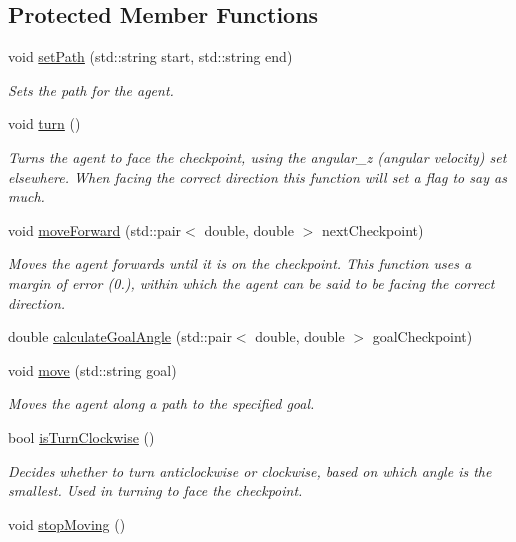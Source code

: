 \subsection*{Protected Member Functions}
\begin{DoxyCompactItemize}
\item 
void \hyperlink{classAgent_a20a0548f91fdfba2727ff8fddc3ce3dc}{set\-Path} (std\-::string start, std\-::string end)
\begin{DoxyCompactList}\small\item\em Sets the path for the agent. \end{DoxyCompactList}\item 
\hypertarget{classAgent_a49e310d66471525dfba98ee4e89e7865}{void \hyperlink{classAgent_a49e310d66471525dfba98ee4e89e7865}{turn} ()}\label{classAgent_a49e310d66471525dfba98ee4e89e7865}

\begin{DoxyCompactList}\small\item\em Turns the agent to face the checkpoint, using the angular\-\_\-z (angular velocity) set elsewhere. When facing the correct direction this function will set a flag to say as much. \end{DoxyCompactList}\item 
\hypertarget{classAgent_a155537d7cbac8ba6982415e15c8e76a9}{void \hyperlink{classAgent_a155537d7cbac8ba6982415e15c8e76a9}{move\-Forward} (std\-::pair$<$ double, double $>$ next\-Checkpoint)}\label{classAgent_a155537d7cbac8ba6982415e15c8e76a9}

\begin{DoxyCompactList}\small\item\em Moves the agent forwards until it is on the checkpoint. This function uses a margin of error (0.), within which the agent can be said to be facing the correct direction. \end{DoxyCompactList}\item 
double \hyperlink{classAgent_a9455180dd9aff369e34e1527bfa6d1a9}{calculate\-Goal\-Angle} (std\-::pair$<$ double, double $>$ goal\-Checkpoint)
\item 
void \hyperlink{classAgent_a5f9de8060bab4248d557f454265eee86}{move} (std\-::string goal)
\begin{DoxyCompactList}\small\item\em Moves the agent along a path to the specified goal. \end{DoxyCompactList}\item 
bool \hyperlink{classAgent_acf69a5a2725a599c84ae2885d31c6d63}{is\-Turn\-Clockwise} ()
\begin{DoxyCompactList}\small\item\em Decides whether to turn anticlockwise or clockwise, based on which angle is the smallest. Used in turning to face the checkpoint. \end{DoxyCompactList}\item 
\hypertarget{classAgent_add59ed077172c91c9b2dddd4ca319f47}{void \hyperlink{classAgent_add59ed077172c91c9b2dddd4ca319f47}{stop\-Moving} ()}\label{classAgent_add59ed077172c91c9b2dddd4ca319f47}


\end{DoxyCompactItemize}

